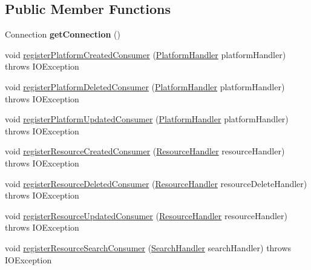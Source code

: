 \subsection*{Public Member Functions}
\begin{DoxyCompactItemize}
\item 
Connection {\bfseries get\+Connection} ()\hypertarget{classeu_1_1h2020_1_1symbiote_1_1communication_1_1RabbitManager_aa3cceb0c39fb9f29c209e228861c71f9}{}\label{classeu_1_1h2020_1_1symbiote_1_1communication_1_1RabbitManager_aa3cceb0c39fb9f29c209e228861c71f9}

\item 
void \hyperlink{classeu_1_1h2020_1_1symbiote_1_1communication_1_1RabbitManager_a7a6a139978888d37dca9e8c28302caf7}{register\+Platform\+Created\+Consumer} (\hyperlink{classeu_1_1h2020_1_1symbiote_1_1handlers_1_1PlatformHandler}{Platform\+Handler} platform\+Handler)  throws I\+O\+Exception 
\item 
void \hyperlink{classeu_1_1h2020_1_1symbiote_1_1communication_1_1RabbitManager_a3880a703e3565ec6e3e963bb12dcb172}{register\+Platform\+Deleted\+Consumer} (\hyperlink{classeu_1_1h2020_1_1symbiote_1_1handlers_1_1PlatformHandler}{Platform\+Handler} platform\+Handler)  throws I\+O\+Exception 
\item 
void \hyperlink{classeu_1_1h2020_1_1symbiote_1_1communication_1_1RabbitManager_a7ccf45180bab08a9a32b262f41705275}{register\+Platform\+Updated\+Consumer} (\hyperlink{classeu_1_1h2020_1_1symbiote_1_1handlers_1_1PlatformHandler}{Platform\+Handler} platform\+Handler)  throws I\+O\+Exception 
\item 
void \hyperlink{classeu_1_1h2020_1_1symbiote_1_1communication_1_1RabbitManager_a0ac5ce822697145440ae35bae985b813}{register\+Resource\+Created\+Consumer} (\hyperlink{classeu_1_1h2020_1_1symbiote_1_1handlers_1_1ResourceHandler}{Resource\+Handler} resource\+Handler)  throws I\+O\+Exception 
\item 
void \hyperlink{classeu_1_1h2020_1_1symbiote_1_1communication_1_1RabbitManager_aab1820f1814d33e13341d9fe98e74f2d}{register\+Resource\+Deleted\+Consumer} (\hyperlink{classeu_1_1h2020_1_1symbiote_1_1handlers_1_1ResourceHandler}{Resource\+Handler} resource\+Delete\+Handler)  throws I\+O\+Exception 
\item 
void \hyperlink{classeu_1_1h2020_1_1symbiote_1_1communication_1_1RabbitManager_a61d5f93decb2e133b040dd598f387c93}{register\+Resource\+Updated\+Consumer} (\hyperlink{classeu_1_1h2020_1_1symbiote_1_1handlers_1_1ResourceHandler}{Resource\+Handler} resource\+Handler)  throws I\+O\+Exception 
\item 
void \hyperlink{classeu_1_1h2020_1_1symbiote_1_1communication_1_1RabbitManager_a9693e85bfdfb097ef357ccbc8c3d8e8a}{register\+Resource\+Search\+Consumer} (\hyperlink{classeu_1_1h2020_1_1symbiote_1_1handlers_1_1SearchHandler}{Search\+Handler} search\+Handler)  throws I\+O\+Exception 
\end{DoxyCompactItemize}


